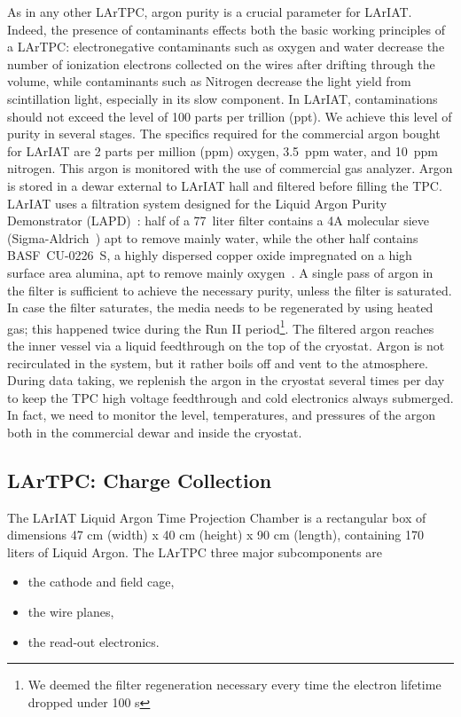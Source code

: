 As in any other LArTPC, argon purity is a crucial parameter for LArIAT. Indeed, the presence of contaminants effects both the basic working principles of a LArTPC: electronegative contaminants such as oxygen and water decrease the number of ionization electrons collected on the wires after drifting through the volume, while contaminants such as Nitrogen decrease the light yield from scintillation light, especially in its slow component.
In LArIAT, contaminations should not exceed the level of 100 parts per trillion (ppt). We achieve this level of purity in several stages. The specifics required for the commercial argon bought for LArIAT are 2 parts per million (ppm) oxygen, 3.5~ppm water, and 10~ppm nitrogen. This argon is monitored with the use of commercial gas analyzer.
Argon is stored in a dewar external to LArIAT hall and filtered before filling the TPC. %
LArIAT uses a filtration system designed for the Liquid Argon Purity Demonstrator (LAPD)~\cite{LAPD}: half of a 77~liter filter contains a 4A molecular sieve (Sigma-Aldrich~\cite{sigma-aldrich}) apt to remove mainly water, while the other half contains BASF~CU-0226~S, a highly dispersed copper oxide impregnated on a high surface area alumina, apt to remove mainly oxygen~\cite{basf}. A single pass of argon in the filter is sufficient to achieve the necessary purity, unless the filter is saturated. In case the filter saturates, the media needs to be regenerated by using heated gas; this happened twice during the Run II period\footnote{We deemed the filter regeneration necessary every time the electron lifetime dropped under 100 \textmu s}.
The filtered argon reaches the inner vessel via a liquid feedthrough on the top of the cryostat. Argon is not recirculated in the system, but it rather boils off and vent to the atmosphere. During data taking, we replenish the argon in the cryostat several times per day to keep the TPC high voltage feedthrough and cold electronics always submerged. In fact, we need to monitor the level, temperatures, and pressures  of the argon both in the commercial dewar and inside the cryostat. 
\subsection{LArTPC: Charge Collection}\label{sec:TPCCharge}
The LArIAT Liquid Argon Time Projection Chamber is a rectangular box of dimensions 47 cm (width) x 40 cm (height) x 90 cm (length), containing 170 liters of Liquid Argon.
The LArTPC three major subcomponents are 
\begin{itemize} 
\item[1)] the cathode and field cage,
\item [2)] the wire planes, 
\item [3)] the read-out electronics. %
\end{itemize}



